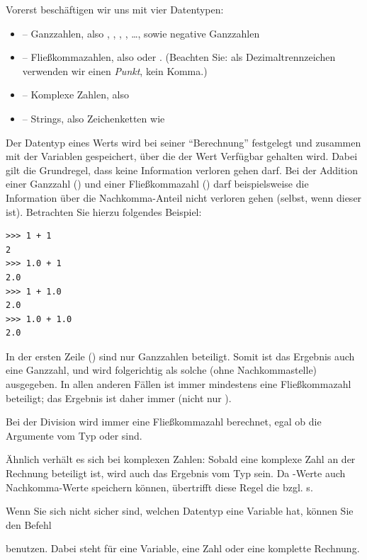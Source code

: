 Vorerst beschäftigen wir uns mit vier Datentypen:
\begin{itemize}
\item {} -- Ganzzahlen, also , , , , 
		\ldots, sowie negative Ganzzahlen
\item {} -- Fließkommazahlen, also  oder . (Beachten Sie: als
		Dezimaltrennzeichen verwenden wir einen \emph{Punkt}, kein Komma.)
\item {} -- Komplexe Zahlen, also 
\item {} -- Strings, also Zeichenketten wie 
\end{itemize}

Der Datentyp eines Werts wird bei seiner \enquote{Berechnung} festgelegt und zusammen mit der Variablen gespeichert, über die der Wert Verfügbar gehalten wird. Dabei gilt die Grundregel, dass keine Information verloren gehen darf. Bei der Addition einer Ganzzahl () und einer Fließkommazahl () darf beispielsweise die Information über die Nachkomma-Anteil nicht verloren gehen (selbst, wenn dieser  ist). Betrachten Sie hierzu folgendes Beispiel:

\begin{cmdbox}
\begin{verbatim}
>>> 1 + 1
2
>>> 1.0 + 1
2.0
>>> 1 + 1.0
2.0
>>> 1.0 + 1.0
2.0
\end{verbatim}
\end{cmdbox}

In der ersten Zeile () sind nur Ganzzahlen beteiligt. Somit ist das Ergebnis auch eine Ganzzahl, und wird folgerichtig als solche (\ie ohne Nachkommastelle) ausgegeben. In allen anderen Fällen ist immer mindestens eine Fließkommazahl beteiligt; das Ergebnis ist daher immer  (nicht nur ).

Bei der Division wird immer eine Fließkommazahl berechnet, egal ob die Argumente vom Typ  oder  sind.

Ähnlich verhält es sich bei komplexen Zahlen: Sobald eine komplexe Zahl an der Rechnung beteiligt ist, wird auch das Ergebnis vom Typ  sein. Da -Werte auch Nachkomma-Werte speichern können, übertrifft diese Regel die bzgl. s.

Wenn Sie sich nicht sicher sind, welchen Datentyp eine Variable hat, können Sie den Befehl
\begin{center}
\end{center}
benutzen. Dabei steht  für eine Variable, eine Zahl oder eine komplette Rechnung.

